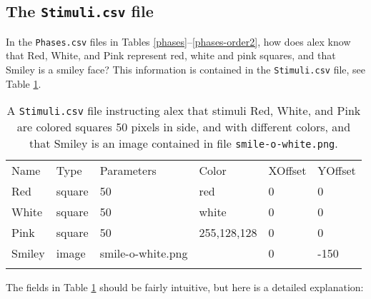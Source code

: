 \documentclass[11pt,]{article}
\renewcommand{\medskip}{}
\begin{document}
\subsection{The \texttt{Stimuli.csv} file}

In the \texttt{Phases.csv} files in Tables
\ref{phases}--\ref{phases-order2}, how does alex know that Red, White,
and Pink represent red, white and pink squares, and that Smiley is a
smiley face? This information is contained in the \texttt{Stimuli.csv}
file, see Table \ref{stimuli}.

\begin{longtable}[c]{@{}llllll@{}}
\hline\noalign{\medskip}
Name & Type & Parameters & Color & XOffset & YOffset
\\\noalign{\medskip}
\hline\noalign{\medskip}
Red & square & 50 & red & 0 & 0
\\\noalign{\medskip}
White & square & 50 & white & 0 & 0
\\\noalign{\medskip}
Pink & square & 50 & 255,128,128 & 0 & 0
\\\noalign{\medskip}
Smiley & image & smile-o-white.png & & 0 & -150
\\\noalign{\medskip}
\hline
\noalign{\medskip}
\caption{A \texttt{Stimuli.csv} file instructing alex that stimuli Red,
White, and Pink are colored squares 50 pixels in side, and with
different colors, and that Smiley is an image contained in file
\texttt{smile-o-white.png}. \label{stimuli}}
\end{longtable}

The fields in Table \ref{stimuli} should be fairly intuitive, but here
is a detailed explanation:
\end{document}
